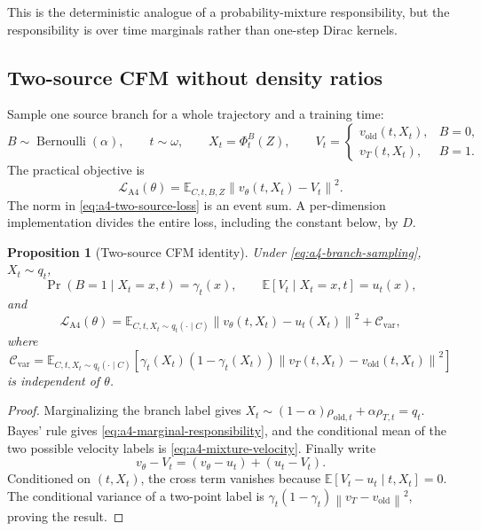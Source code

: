 \documentclass[11pt,a4paper]{article}
\newcommand{\E}{\mathbb{E}}
\newcommand{\norm}[1]{\left\lVert #1 \right\rVert}
\newcommand{\vold}{v_{\mathrm{old}}}
\newcommand{\vT}{v_T}
\newcommand{\vtheta}{v_\theta}
\theoremstyle{plain}
\newtheorem{proposition}[theorem]{Proposition}
\theoremstyle{definition}
\begin{document}
This is the deterministic analogue of a probability-mixture responsibility, but the
responsibility is over time marginals rather than one-step Dirac kernels.

\subsection{Two-source CFM without density ratios}

Sample one source branch for a whole trajectory and a training time:
\begin{equation}
B\sim\operatorname{Bernoulli}(\alpha),
\qquad
t\sim\omega,
\qquad
X_t=\Phi_t^B(Z),
\qquad
V_t=
\begin{cases}
\vold(t,X_t), & B=0,\\
\vT(t,X_t), & B=1.
\end{cases}
\label{eq:a4-branch-sampling}
\end{equation}
The practical objective is
\begin{equation}
\mathcal L_{\mathrm{A4}}(\theta)
=
\E_{C,t,B,Z}
\norm{\vtheta(t,X_t)-V_t}^2 .
\label{eq:a4-two-source-loss}
\end{equation}
The norm in \eqref{eq:a4-two-source-loss} is an event sum.  A per-dimension implementation divides
the entire loss, including the constant below, by $D$.

\begin{proposition}[Two-source CFM identity]
\label{prop:a4-cfm}
Under \eqref{eq:a4-branch-sampling},
$X_t\sim q_t$,
\begin{equation}
\Pr(B=1\mid X_t=x,t)=\gamma_t(x),
\qquad
\E[V_t\mid X_t=x,t]=u_t(x),
\label{eq:a4-conditional-mean}
\end{equation}
and
\begin{equation}
\mathcal L_{\mathrm{A4}}(\theta)
=
\E_{C,t,X_t\sim q_t(\cdot\mid C)}
\norm{\vtheta(t,X_t)-u_t(X_t)}^2
+\mathcal C_{\mathrm{var}},
\label{eq:a4-cfm-decomposition}
\end{equation}
where
\begin{equation}
\mathcal C_{\mathrm{var}}
=
\E_{C,t,X_t\sim q_t(\cdot\mid C)}\!\left[
  \gamma_t(X_t)(1-\gamma_t(X_t))
  \norm{\vT(t,X_t)-\vold(t,X_t)}^2
\right]
\label{eq:a4-variance-constant}
\end{equation}
is independent of $\theta$.
\end{proposition}

\begin{proof}
Marginalizing the branch label gives
$X_t\sim(1-\alpha)\rho_{\mathrm{old},t}+\alpha\rho_{T,t}=q_t$.  Bayes' rule gives
\eqref{eq:a4-marginal-responsibility}, and the conditional mean of the two possible velocity
labels is \eqref{eq:a4-mixture-velocity}.  Finally write
\[
\vtheta-V_t=(\vtheta-u_t)+(u_t-V_t).
\]
Conditioned on $(t,X_t)$, the cross term vanishes because
$\E[V_t-u_t\mid t,X_t]=0$.  The conditional variance of a two-point label is
$\gamma_t(1-\gamma_t)\norm{\vT-\vold}^2$, proving the result.
\end{proof}
\end{document}
